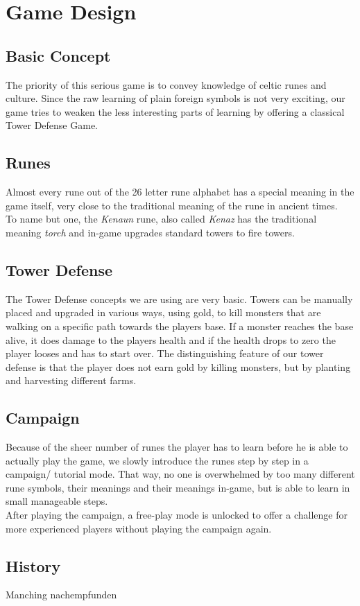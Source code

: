 \section{Game Design}
\label{sec:game_design}

\cite{rieckhoff-celts-in-germany}

\subsection{Basic Concept}
The priority of this serious game is to convey knowledge of celtic runes and culture. 
Since the raw learning of plain foreign symbols is not very exciting, our game tries to weaken the less interesting parts of learning by offering a classical Tower Defense Game.

\subsection{Runes}

Almost every rune out of the 26 letter rune alphabet has a special meaning in the game itself, very close to the traditional meaning of the rune in ancient times.\\
To name but one, the \emph{Kenaun} rune, also called \emph{Kenaz} has the traditional meaning \emph{torch} and in-game upgrades standard towers to fire towers.

\subsection{Tower Defense}

The Tower Defense concepts we are using are very basic. Towers can be manually placed and upgraded in various ways, using gold, to kill monsters that are walking on a specific path towards the players base. If a monster reaches the base alive, it does damage to the players health and if the health drops to zero the player looses and has to start over. 
The distinguishing feature of our tower defense is that the player does not earn gold by killing monsters, but by planting and harvesting different farms.

\subsection{Campaign}

Because of the sheer number of runes the player has to learn before he is able to actually play the game, we slowly introduce the runes step by step in a campaign/ tutorial mode. That way, no one is overwhelmed by too many different rune symbols, their meanings and their meanings in-game, but is able to learn in small manageable steps. \\
After playing the campaign, a free-play mode is unlocked to offer a challenge for more experienced players without playing the campaign again. \\

\subsection{History}



Manching nachempfunden